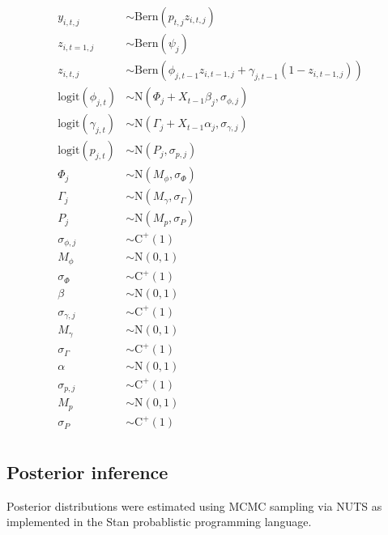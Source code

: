 \documentclass[12pt,letterpaper]{article}
\begin{document}
\begin{equation}
  \begin{aligned}
    y_{i, t, j} &\sim \mathrm{Bern}(p_{t, j} z_{i, t, j}) \\
    z_{i, t = 1, j} &\sim \mathrm{Bern}(\psi_{j}) \\
    z_{i, t, j} &\sim \mathrm{Bern}(\phi_{j, t - 1} z_{i, t - 1, j} + \gamma_{j, t - 1} (1 - z_{i, t - 1, j})) \\
    \mathrm{logit}(\phi_{j, t}) &\sim \mathrm{N}(\Phi_{j} + X_{t - 1}\beta_{j}, \sigma_{\phi, j}) \\
    \mathrm{logit}(\gamma_{j, t}) &\sim \mathrm{N}(\Gamma_{j} + X_{t - 1}\alpha_{j}, \sigma_{\gamma, j}) \\
    \mathrm{logit}(p_{j, t}) &\sim \mathrm{N}(P_{j}, \sigma_{p, j}) \\
    \Phi_{j} &\sim \mathrm{N}(M_{\phi}, \sigma_{\Phi}) \\
    \Gamma_{j} &\sim \mathrm{N}(M_{\gamma}, \sigma_{\Gamma}) \\
    P_{j} &\sim \mathrm{N}(M_{p}, \sigma_{P}) \\
    \sigma_{\phi, j} &\sim \mathrm{C}^{+}(1) \\
    M_{\phi} &\sim \mathrm{N}(0, 1) \\
    \sigma_{\Phi} &\sim \mathrm{C}^{+}(1) \\
    \beta &\sim \mathrm{N}(0, 1) \\
    \sigma_{\gamma, j} &\sim \mathrm{C}^{+}(1) \\
    M_{\gamma} &\sim \mathrm{N}(0, 1) \\
    \sigma_{\Gamma} &\sim \mathrm{C}^{+}(1) \\
    \alpha &\sim \mathrm{N}(0, 1) \\
    \sigma_{p, j} &\sim \mathrm{C}^{+}(1) \\
    M_{p} &\sim \mathrm{N}(0, 1) \\
    \sigma_{P} &\sim \mathrm{C}^{+}(1) \\
  \end{aligned}
\end{equation}


\subsection{Posterior inference}
Posterior distributions were estimated using MCMC sampling via NUTS as implemented in the Stan probablistic programming language.
\end{document}
